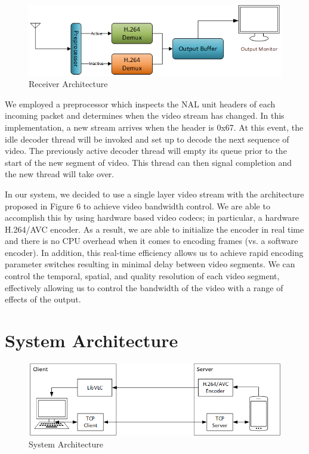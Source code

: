 \documentclass[a4paper,12pt]{article}
\begin{document}
\begin{figure}[h]
\centering
\includegraphics[width=0.8\linewidth]{ReceiverArchitecture.png}
\caption{Receiver Architecture}
\label{fig:ReceiverArchitecture}
\end{figure}
We employed a preprocessor which inspects the NAL unit headers of each incoming packet and determines when the video stream has changed. In this implementation, a new stream arrives when the header is 0x67. At this event, the idle decoder thread will be invoked and set up to decode the next sequence of video. The previously active decoder thread will empty its queue prior to the start of the new segment of video. This thread can then signal completion and the new thread will take over.

In our system, we decided to use a single layer video stream with the architecture proposed in Figure 6 to achieve video bandwidth control. We are able to accomplish this by using hardware based video codecs; in particular, a hardware H.264/AVC encoder. As a result, we are able to initialize the encoder in real time and there is no CPU overhead when it comes to encoding frames (vs. a software encoder). In addition, this real-time efficiency allows us to achieve rapid encoding parameter switches resulting in minimal delay between video segments. We can control the temporal, spatial, and quality resolution of each video segment, effectively allowing us to control the bandwidth of the video with a range of effects of the output.


\section{System Architecture}
\label{sec:Architecture}
\begin{figure}[h]
\centering
\includegraphics[width=0.8\linewidth]{SystemArchitecture.png}
\caption{System Architecture}
\label{fig:SystemArchitecture}
\end{figure}
\end{document}
